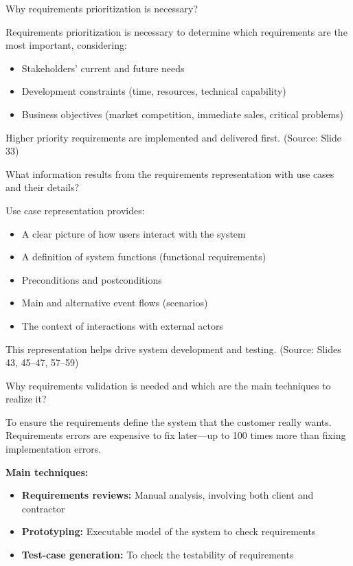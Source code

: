 \documentclass[12pt]{article}
\begin{document}
\begin{questionbox}
Why requirements prioritization is necessary?
\end{questionbox}

Requirements prioritization is necessary to determine which requirements are the most important, considering:
\begin{itemize}
    \item Stakeholders' current and future needs
    \item Development constraints (time, resources, technical capability)
    \item Business objectives (market competition, immediate sales, critical problems)
\end{itemize}

Higher priority requirements are implemented and delivered first.
(Source: Slide 33)

\begin{questionbox}
What information results from the requirements representation with use cases and their details?
\end{questionbox}

Use case representation provides:
\begin{itemize}
    \item A clear picture of how users interact with the system
    \item A definition of system functions (functional requirements)
    \item Preconditions and postconditions
    \item Main and alternative event flows (scenarios)
    \item The context of interactions with external actors
\end{itemize}

This representation helps drive system development and testing.
(Source: Slides 43, 45--47, 57--59)

\begin{questionbox}
Why requirements validation is needed and which are the main techniques to realize it?
\end{questionbox}

To ensure the requirements define the system that the customer really wants. Requirements errors are expensive to fix later—up to 100 times more than fixing implementation errors.

\textbf{Main techniques:}
\begin{itemize}
    \item \textbf{Requirements reviews:} Manual analysis, involving both client and contractor
    \item \textbf{Prototyping:} Executable model of the system to check requirements
    \item \textbf{Test-case generation:} To check the testability of requirements
\end{itemize}
\end{document}

